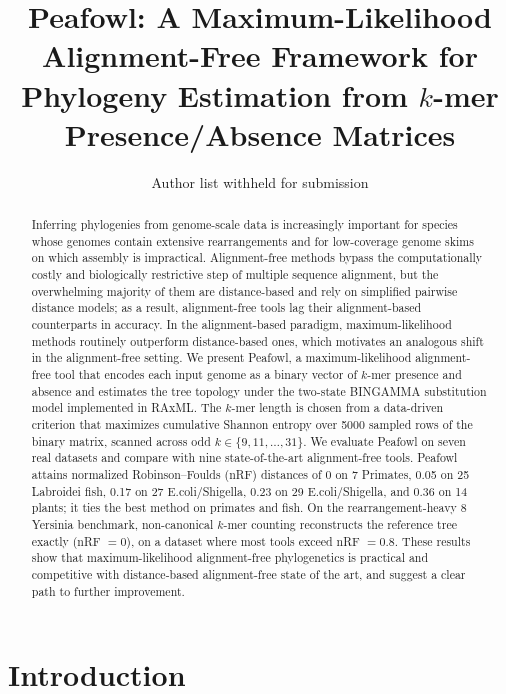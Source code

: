 \documentclass[11pt]{article}
\title{Peafowl: A Maximum-Likelihood Alignment-Free Framework for\\ Phylogeny Estimation from $k$-mer Presence/Absence Matrices}
\author{Author list withheld for submission}
\date{}
\begin{document}
\maketitle

\begin{abstract}
Inferring phylogenies from genome-scale data is increasingly important for
species whose genomes contain extensive rearrangements and for low-coverage
genome skims on which assembly is impractical. Alignment-free methods bypass
the computationally costly and biologically restrictive step of multiple
sequence alignment, but the overwhelming majority of them are distance-based
and rely on simplified pairwise distance models; as a result, alignment-free
tools lag their alignment-based counterparts in accuracy. In the
alignment-based paradigm, maximum-likelihood methods routinely outperform
distance-based ones, which motivates an analogous shift in the alignment-free
setting. We present Peafowl, a maximum-likelihood alignment-free tool that
encodes each input genome as a binary vector of $k$-mer presence and absence
and estimates the tree topology under the two-state BINGAMMA substitution
model implemented in RAxML. The $k$-mer length is chosen from a data-driven
criterion that maximizes cumulative Shannon entropy over 5000 sampled rows
of the binary matrix, scanned across odd $k \in \{9, 11, \ldots, 31\}$. We
evaluate Peafowl on seven real datasets and compare with nine state-of-the-art
alignment-free tools. Peafowl attains normalized Robinson--Foulds (nRF)
distances of 0 on 7 Primates, 0.05 on 25 Labroidei fish, 0.17 on 27
E.coli/Shigella, 0.23 on 29 E.coli/Shigella, and 0.36 on 14 plants; it ties
the best method on primates and fish. On the rearrangement-heavy 8 Yersinia
benchmark, non-canonical $k$-mer counting reconstructs the reference tree
exactly (nRF $= 0$), on a dataset where most tools exceed nRF $= 0.8$. These
results show that maximum-likelihood alignment-free phylogenetics is
practical and competitive with distance-based alignment-free state of the
art, and suggest a clear path to further improvement.
\end{abstract}

\section{Introduction}
\end{document}
